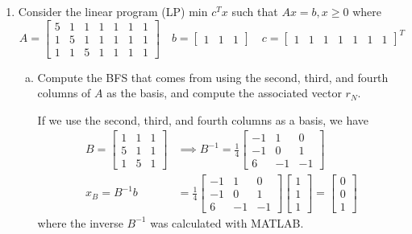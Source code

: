 \documentclass{article}
\begin{document}
\begin{enumerate}
\begin{enumerate}[a)]
		\end{enumerate}

	\item Consider the linear program (LP) min $c^T x$ such that $Ax=b, x\ge 0$ where \[A=\begin{bmatrix}
				5 & 1 & 1 & 1 & 1 & 1 & 1 \\
				1 & 5 & 1 & 1 & 1 & 1 & 1 \\
				1 & 1 & 5 & 1 & 1 & 1 & 1
			\end{bmatrix}\quad b=\begin{bmatrix}
				1 & 1 & 1
			\end{bmatrix}\quad c=\begin{bmatrix}
				1 & 1 & 1 & 1 & 1 & 1 & 1
		\end{bmatrix}^T\]

		\begin{enumerate}[a)]
			\item Compute the BFS that comes from using the second, third, and fourth columns of $A$ as the basis, and compute the associated vector $r_N.$
				\begin{soln}
					If we use the second, third, and fourth columns as a basis, we have 
					\begin{align*}
						B=\begin{bmatrix}
							1 & 1 & 1 \\
							5 & 1 & 1 \\
							1 & 5 & 1
						\end{bmatrix}&\implies B^{-1} = \frac{1}{4}\begin{bmatrix}
							-1 & 1 & 0 \\
							-1 & 0 & 1 \\
							6 & -1 & -1
						\end{bmatrix} \\
						x_B = B^{-1}b &= \frac{1}{4}\begin{bmatrix}
							-1 & 1 & 0 \\
							-1 & 0 & 1 \\
							6 & -1 & -1
						\end{bmatrix} \begin{bmatrix}
							1 \\ 1 \\ 1
						\end{bmatrix} = \begin{bmatrix}
							0 \\ 0 \\ 1
						\end{bmatrix}
					\end{align*} where the inverse $B^{-1}$ was calculated with MATLAB. 


\end{soln}
\end{enumerate}
\end{enumerate}
\end{document}
